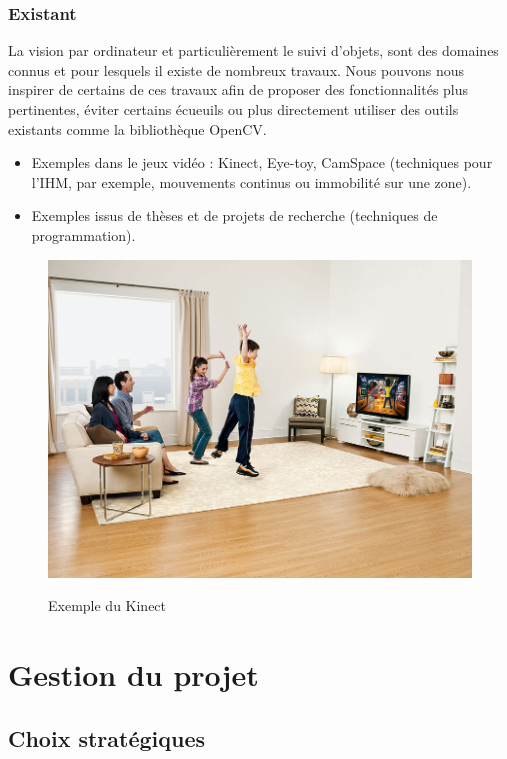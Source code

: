 \documentclass{report}
\begin{document}
		\subsubsection{Existant}
		La vision par ordinateur et particulièrement le suivi d'objets, sont des domaines connus et pour lesquels il existe de nombreux travaux. Nous pouvons nous inspirer de certains de ces travaux afin de proposer des fonctionnalités plus pertinentes, éviter certains écueuils ou plus directement utiliser des outils existants comme la bibliothèque OpenCV.\\
			\begin{itemize}
				\item Exemples dans le jeux vidéo : Kinect, Eye-toy, CamSpace (techniques pour l'IHM, par exemple, mouvements continus ou immobilité sur une zone).
				\item Exemples issus de thèses et de projets de recherche (techniques de programmation).
			\end{itemize}
			\begin{figure}[!h]
				\centering
				\includegraphics[scale=0.2]{../images/kinect_screen_lg.jpg}\\
				\caption{Exemple du Kinect}
				\label{Exemple du Kinect}
			\end{figure}
		\newpage
		\section{Gestion du projet}
			\subsection{Choix stratégiques}
\end{document}
